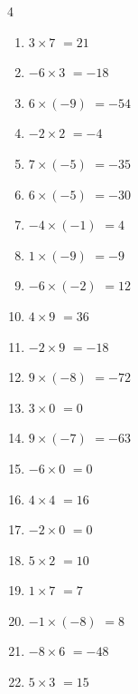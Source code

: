 \begin{multicols}{4}
\begin{enumerate}
  \item $3\times 7$
        $=21$

  \item $-6\times 3$
        $=-18$

  \item $6\times (-9)$
        $=-54$

  \item $-2\times 2$
        $=-4$

  \item $7\times (-5)$
        $=-35$

  \item $6\times (-5)$
        $=-30$

  \item $-4\times (-1)$
        $=4$

  \item $1\times (-9)$
        $=-9$

  \item $-6\times (-2)$
        $=12$

  \item $4\times 9$
        $=36$

\columnbreak %

  \item $-2\times 9$
        $=-18$

  \item $9\times (-8)$
        $=-72$

  \item $3\times 0$
        $=0$

  \item $9\times (-7)$
        $=-63$

  \item $-6\times 0$
        $=0$

  \item $4\times 4$
        $=16$

  \item $-2\times 0$
        $=0$

  \item $5\times 2$
        $=10$

  \item $1\times 7$
        $=7$

  \item $-1\times (-8)$
        $=8$

  \item $-8\times 6$
        $=-48$

  \item $5\times 3$
        $=15$


\end{enumerate}
\end{multicols}
